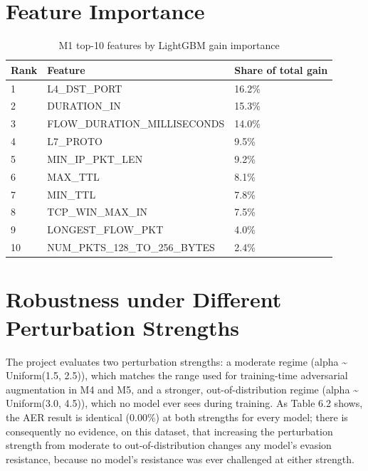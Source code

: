 \documentclass[12pt,a4paper]{report}
\begin{document}
\section{Feature Importance}
\begin{table}[h]\centering
\caption{M1 top-10 features by LightGBM gain importance}
\begin{tabularx}{\linewidth}{XXX}
\toprule
\textbf{Rank} & \textbf{Feature} & \textbf{Share of total gain} \\
\midrule
1 & L4\_DST\_PORT & 16.2\% \\
2 & DURATION\_IN & 15.3\% \\
3 & FLOW\_DURATION\_MILLISECONDS & 14.0\% \\
4 & L7\_PROTO & 9.5\% \\
5 & MIN\_IP\_PKT\_LEN & 9.2\% \\
6 & MAX\_TTL & 8.1\% \\
7 & MIN\_TTL & 7.8\% \\
8 & TCP\_WIN\_MAX\_IN & 7.5\% \\
9 & LONGEST\_FLOW\_PKT & 4.0\% \\
10 & NUM\_PKTS\_128\_TO\_256\_BYTES & 2.4\% \\
\bottomrule
\end{tabularx}
\end{table}
\section{Robustness under Different Perturbation Strengths}
The project evaluates two perturbation strengths: a moderate regime (alpha \textasciitilde{} Uniform(1.5, 2.5)), which matches the range used for training-time adversarial augmentation in M4 and M5, and a stronger, out-of-distribution regime (alpha \textasciitilde{} Uniform(3.0, 4.5)), which no model ever sees during training. As Table 6.2 shows, the AER result is identical (0.00\%) at both strengths for every model; there is consequently no evidence, on this dataset, that increasing the perturbation strength from moderate to out-of-distribution changes any model's evasion resistance, because no model's resistance was ever challenged at either strength.
\end{document}
